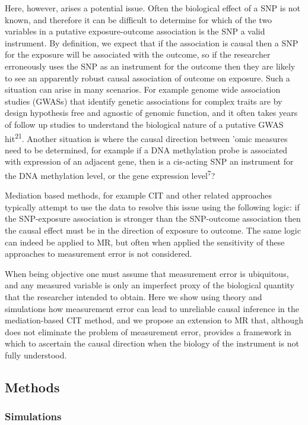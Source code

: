 \documentclass[]{article}
\begin{document}
Here, however, arises a potential issue. Often the biological effect of
a SNP is not known, and therefore it can be difficult to determine for
which of the two variables in a putative exposure-outcome association is
the SNP a valid instrument. By definition, we expect that if the
association is causal then a SNP for the exposure will be associated
with the outcome, so if the researcher erroneously uses the SNP as an
instrument for the outcome then they are likely to see an apparently
robust causal association of outcome on exposure. Such a situation can
arise in many scenarios. For example genome wide association studies
(GWASs) that identify genetic associations for complex traits are by
design hypothesis free and agnostic of genomic function, and it often
takes years of follow up studies to understand the biological nature of
a putative GWAS hit\textsuperscript{21}. Another situation is where the
causal direction between 'omic measures need to be determined, for
example if a DNA methylation probe is associated with expression of an
adjacent gene, then is a cis-acting SNP an instrument for the DNA
methylation level, or the gene expression level\textsuperscript{7}?

Mediation based methods, for example CIT and other related approaches
typically attempt to use the data to resolve this issue using the
following logic: if the SNP-exposure association is stronger than the
SNP-outcome association then the causal effect must be in the direction
of exposure to outcome. The same logic can indeed be applied to MR, but
often when applied the sensitivity of these approaches to measurement
error is not considered.

When being objective one must assume that measurement error is
ubiquitous, and any measured variable is only an imperfect proxy of the
biological quantity that the researcher intended to obtain. Here we show
using theory and simulations how measurement error can lead to
unreliable causal inference in the mediation-based CIT method, and we
propose an extension to MR that, although does not eliminate the problem
of measurement error, provides a framework in which to ascertain the
causal direction when the biology of the instrument is not fully
understood.

\subsection{Methods}\label{methods}

\subsubsection{Simulations}\label{simulations}
\end{document}

